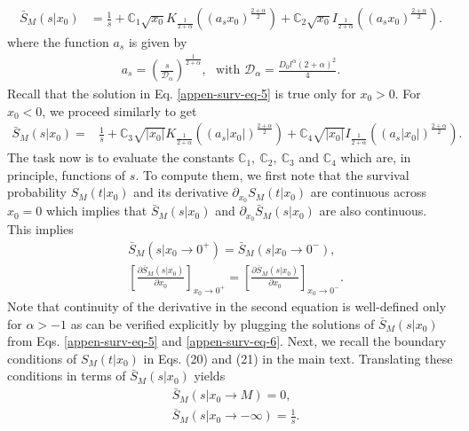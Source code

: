 \documentclass[superscriptaddress,amsmath,amssymb,aps,onecolumn]{revtex4}
\def\greenw#1{{\color{black} #1}}
\begin{document}
\begin{align}
\bar{S}_M(s|x_0) &= \frac{1}{s} +\mathbb{C}_1 \sqrt{x_0}K_{\frac{1}{2+\alpha}} \left(  (a_s x_0)^{\frac{2+\alpha}{2}}\right)+\mathbb{C}_2 \sqrt{x_0}I_{\frac{1}{2+\alpha}} \left(  (a_s x_0)^{\frac{2+\alpha}{2}}\right).
\label{appen-surv-eq-5}
\end{align} 
where the function $a_s$ is given by
\begin{align}
a_s  = \left(\frac{s}{\mathcal{D}_{\alpha}} \right)^{\frac{1}{2+\alpha}},~~~\text{with }\mathcal{D}_{\alpha} = \frac{D_0 l^{\alpha} (2+\alpha)^2}{4}.\label{new-appen-extreme-eq-9}
\end{align}
Recall that the solution in Eq. \eqref{appen-surv-eq-5} is true only for $x_0 >0$. For $x_0 <0$, we proceed similarly to get
\begin{align}
\bar{S}_M(s|x_0) = &\frac{1}{s} +\mathbb{C}_3 \sqrt{|x_0|}K_{\frac{1}{2+\alpha}} \left(  (a_s |x_0|)^{\frac{2+\alpha}{2}}\right) +\mathbb{C}_4 \sqrt{|x_0|}I_{\frac{1}{2+\alpha}} \left(  (a_s |x_0|)^{\frac{2+\alpha}{2}}\right).
\label{appen-surv-eq-6}
\end{align}
The task now is to evaluate the constants $\mathbb{C}_1,~\mathbb{C}_2,~\mathbb{C}_3$ and $\mathbb{C}_4$ which are, in principle, functions of $s$. To compute them, we first note that the survival probability $S_M(t|x_0)$ and its derivative $\partial _{x_0} S_M(t|x_0)$ are continuous across $x_0 = 0$ which implies that $\bar{S}_M(s|x_0)$ and $\partial _{x_0} \bar{S}_M(s|x_0)$ are also continuous. This implies
\begin{align}
& \bar{S}_M(s|x_0 \to 0^+) = \bar{S}_M(s|x_0 \to 0^-), \label{appen-surv-eq-7} \\
& \left[\frac{\partial \bar{S}_M(s|x_0 )}{\partial x_0}\right] _{x_0 \to 0^+} = \left[\frac{\partial \bar{S}_M(s|x_0 )}{\partial x_0}\right] _{x_0 \to 0^-}. \label{appen-surv-eq-8}
\end{align}
\greenw{Note that continuity of the derivative in the second equation is well-defined only for $\alpha >-1$ as can be verified explicitly by plugging the solutions of $\bar{S}_M(s|x_0)$ from Eqs. \eqref{appen-surv-eq-5} and \eqref{appen-surv-eq-6}.} Next, we recall the boundary conditions of $S_M(t|x_0)$ in Eqs. (20) and (21) in the main text. Translating these conditions in terms of $\bar{S}_M(s|x_0 )$ yields
\begin{align}
& \bar{S}_M(s|x_0 \to M) = 0,  \label{appen-surv-eq-9} \\
& \bar{S}_M(s|x_0 \to -\infty) = \frac{1}{s} \label{appen-surv-eq-10}.
\end{align}
\end{document}
